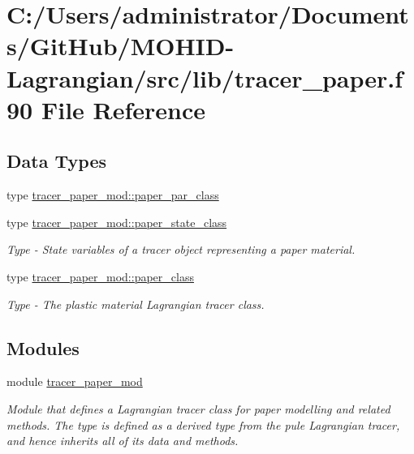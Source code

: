 \hypertarget{tracer__paper_8f90}{}\section{C\+:/\+Users/administrator/\+Documents/\+Git\+Hub/\+M\+O\+H\+I\+D-\/\+Lagrangian/src/lib/tracer\+\_\+paper.f90 File Reference}
\label{tracer__paper_8f90}
\subsection*{Data Types}
\begin{DoxyCompactItemize}
\item 
type \hyperlink{structtracer__paper__mod_1_1paper__par__class}{tracer\+\_\+paper\+\_\+mod\+::paper\+\_\+par\+\_\+class}
\item 
type \hyperlink{structtracer__paper__mod_1_1paper__state__class}{tracer\+\_\+paper\+\_\+mod\+::paper\+\_\+state\+\_\+class}
\begin{DoxyCompactList}\small\item\em Type -\/ State variables of a tracer object representing a paper material. \end{DoxyCompactList}\item 
type \hyperlink{structtracer__paper__mod_1_1paper__class}{tracer\+\_\+paper\+\_\+mod\+::paper\+\_\+class}
\begin{DoxyCompactList}\small\item\em Type -\/ The plastic material Lagrangian tracer class. \end{DoxyCompactList}\end{DoxyCompactItemize}
\subsection*{Modules}
\begin{DoxyCompactItemize}
\item 
module \hyperlink{namespacetracer__paper__mod}{tracer\+\_\+paper\+\_\+mod}
\begin{DoxyCompactList}\small\item\em Module that defines a Lagrangian tracer class for paper modelling and related methods. The type is defined as a derived type from the pule Lagrangian tracer, and hence inherits all of it\textquotesingle{}s data and methods. \end{DoxyCompactList}\end{DoxyCompactItemize}
